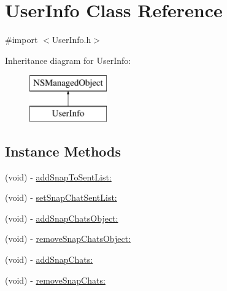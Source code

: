 \hypertarget{interface_user_info}{}\section{User\+Info Class Reference}
\label{interface_user_info}


{\ttfamily \#import $<$User\+Info.\+h$>$}

Inheritance diagram for User\+Info\+:\begin{figure}[H]
\begin{center}
\leavevmode
\includegraphics[height=2.000000cm]{interface_user_info}
\end{center}
\end{figure}
\subsection*{Instance Methods}
\begin{DoxyCompactItemize}
\item 
(void) -\/ \hyperlink{interface_user_info_a1f91afa8dd848ef5aaa3904c7da857dc}{add\+Snap\+To\+Sent\+List\+:}
\item 
(void) -\/ \hyperlink{interface_user_info_a9990c43706b23a8a14601d05a2f6cd79}{set\+Snap\+Chat\+Sent\+List\+:}
\item 
(void) -\/ \hyperlink{interface_user_info_a60a99590b470d8c11ee23e47ac20b09a}{add\+Snap\+Chats\+Object\+:}
\item 
(void) -\/ \hyperlink{interface_user_info_a8ac63ce90e9911d188c01c95ec18b638}{remove\+Snap\+Chats\+Object\+:}
\item 
(void) -\/ \hyperlink{interface_user_info_a7f9a4fea0aa960f777e6f5763f6de9f0}{add\+Snap\+Chats\+:}
\item 
(void) -\/ \hyperlink{interface_user_info_a7b335565ece5b09bb633af92eeaf47eb}{remove\+Snap\+Chats\+:}
\end{DoxyCompactItemize}
